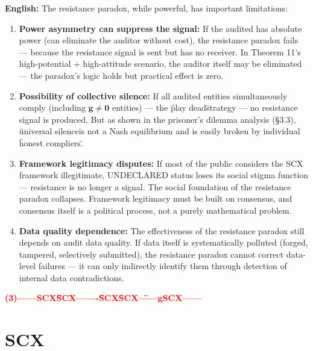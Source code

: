 \documentclass[12pt,a4paper]{article}
\theoremstyle{remark}
\newcommand{\g}{\mathbf{g}}
\newcommand{\honestcrit}[1]{%
    \textcolor{red}{\textbf{#1}}%
}
\begin{document}
\vspace{6pt}
\noindent
\textbf{English:} The resistance paradox, while powerful, has important limitations:

\begin{enumerate}[label=(\arabic*)]
    \item \textbf{Power asymmetry can suppress the signal:} If the audited has absolute power (can eliminate the auditor without cost), the resistance paradox fails — because the resistance signal is sent but has no receiver. In Theorem 11's high-potential + high-attitude scenario, the auditor itself may be eliminated — the paradox's logic holds but practical effect is zero.
    
    \item \textbf{Possibility of collective silence:} If all audited entities simultaneously comply (including $ \g \neq \mathbf{0} $ entities) — the \"play dead\" strategy — no resistance signal is produced. But as shown in the prisoner's dilemma analysis (§3.3), \"universal silence\" is not a Nash equilibrium and is easily broken by individual \"honest compliers.\"
    
    \item \textbf{Framework legitimacy disputes:} If most of the public considers the SCX framework illegitimate, UNDECLARED status loses its social stigma function — resistance is no longer a signal. The social foundation of the resistance paradox collapses. Framework legitimacy must be built on consensus, and consensus itself is a political process, not a purely mathematical problem.
    
    \item \textbf{Data quality dependence:} The effectiveness of the resistance paradox still depends on audit data quality. If data itself is systematically polluted (forged, tampered, selectively submitted), the resistance paradox cannot correct data-level failures — it can only indirectly identify them through detection of internal data contradictions.
\end{enumerate}

\honestcrit{(3)——SCX\"\"\"\"SCX——-\"\"SCX\"SCX\"——$ \g $SCX——}

\section{SCX}
\end{document}
